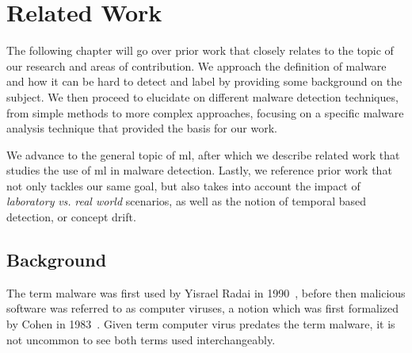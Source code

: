
\chapter{Related Work}
\label{chapter:related_work}

The following chapter will go over prior work that closely relates to the topic of our research and areas of contribution.
We approach the definition of malware and how it can be hard to detect and label by providing some background on the subject.
We then proceed to elucidate on different malware detection techniques, from simple methods to more complex approaches, focusing on a specific malware analysis technique that provided the basis for our work.

We advance to the general topic of \gls{ml}, after which we describe related work that studies the use of \gls{ml} in malware detection.
Lastly, we reference prior work that not only tackles our same goal, but also takes into account the impact of \textit{laboratory} \textit{vs.} \textit{real world} scenarios, as well as the notion of temporal based detection, or concept drift.

\section{Background}
\label{section:background}

The term malware was first used by Yisrael Radai in 1990~\cite{elisan:malware}, before then malicious software was referred to as computer viruses, a notion which was first formalized by Cohen in 1983~\cite{cohen:virus}.
Given term computer virus predates the term malware, it is not uncommon to see both terms used interchangeably.

